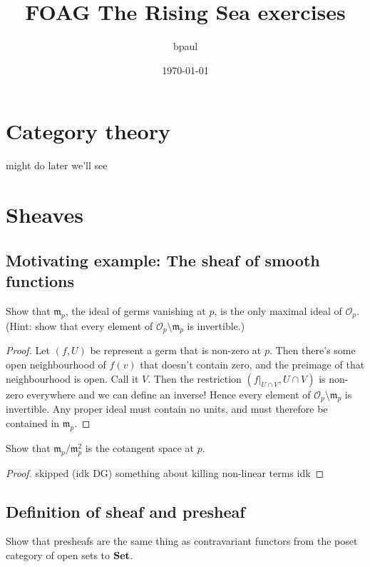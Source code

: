 \documentclass{article}
\title{FOAG The Rising Sea exercises}
\author{bpaul}
\date{\today}
\begin{document}
\maketitle

\section{Category theory}
might do later we'll see

\section{Sheaves}

\subsection{Motivating example: The sheaf of smooth functions}

\begin{exercise}
    Show that \(\mathfrak{m}_p\), the ideal of germs vanishing at \(p\), is the only maximal ideal of \(\mathscr{O}_p\).
    (Hint: show that every element of \(\mathscr{O}_p \setminus \mathfrak{m}_p\) is invertible.)
\end{exercise}

\begin{proof}
    Let \((f, U)\) be represent a germ that is non-zero at \(p\).
    Then there's some open neighbourhood of \(f(v)\) that doesn't contain zero, and the preimage of that neighbourhood is open.
    Call it \(V\).
    Then the restriction \((f |_{U \cap V}, U \cap V)\) is non-zero everywhere and we can define an inverse!
    Hence every element of \(\mathscr{O}_p \setminus \mathfrak{m}_p\) is invertible.
    Any proper ideal must contain no units, and must therefore be contained in \(\mathfrak{m}_p\).
\end{proof}

\begin{exercise}
    Show that \(\mathfrak{m}_p / \mathfrak{m}_p^2\) is the cotangent space at \(p\).
\end{exercise}

\begin{proof}
    skipped (idk DG) something about killing non-linear terms idk
\end{proof}

\subsection{Definition of sheaf and presheaf}
\begin{exercise}
    Show that presheafs are the same thing as contravariant functors from the poset category of open sets to \(\mathbf{Set}\).
\end{exercise}
\end{document}
